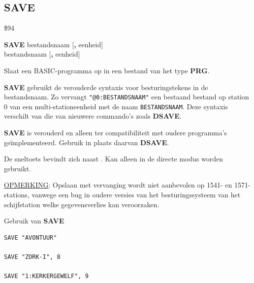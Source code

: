 
\newpage
\subsection{SAVE}
\begin{description}[leftmargin=2cm,style=nextline]
\item [Token:]    \$94

\item [Formaat:]   {\bf SAVE} bestandsnaam [{\bf,} eenheid] \\                 \megakeywhite{$\leftarrow$} bestandsnaam [{\bf,} eenheid]

\item [Gebruik:]    Slaat een BASIC-programma op in een bestand van het type {\bf PRG}.

                  \filenamedefinition

{\bf SAVE} gebruikt de verouderde syntaxis voor besturingstekens in de bestandsnaam. Zo vervangt \texttt{"@0:BESTANDSNAAM"} een bestaand bestand op station 0 van een multi-stationeenheid met de naam \texttt{BESTANDSNAAM}. Deze syntaxis verschilt van die van nieuwere commando's zoals {\bf DSAVE}.

                  \unitdefinition

\item [Opmerkingen:]  {\bf SAVE} is verouderd en alleen ter compatibiliteit met oudere programma's geïmplementeerd. Gebruik in plaats daarvan {\bf DSAVE}.

                  De sneltoets \megakeywhite{$\leftarrow$} bevindt zich naast . Kan alleen in de directe modus worden gebruikt.

                  \underline{OPMERKING}: Opslaan met vervanging wordt niet aanbevolen op 1541- en 1571-stations, vanwege een bug in oudere versies van het besturingssysteem van het schijfstation welke gegevensverlies kan veroorzaken.

\item [Voorbeelden:] Gebruik van {\bf SAVE}

\begin{tcolorbox}[colback=black,coltext=white]
\verbatimfont{\codefont}
\begin{verbatim}
SAVE "AVONTUUR"

SAVE "ZORK-I", 8

SAVE "1:KERKERGEWELF", 9
\end{verbatim}
\end{tcolorbox}
\end{description}

